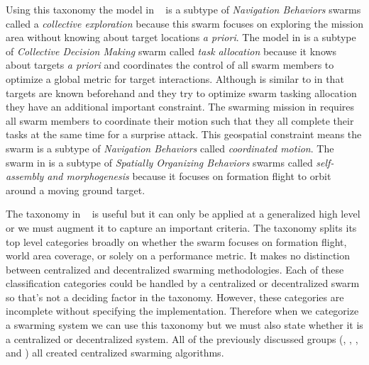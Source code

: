Using this taxonomy the model in ~\textcite{jin} is a subtype of \textit{Navigation Behaviors} swarms called a \textit{collective exploration} because this swarm focuses on exploring the mission area without knowing about target locations \textit{a priori}.  The model in \textcite{bellingham} is a subtype of \textit{Collective Decision Making} swarm called \textit{task allocation}  because it knows about targets \textit{a priori} and coordinates the control of all swarm members to optimize a global metric for target interactions.  Although \textcite{beard} is similar to \textcite{bellingham} in that targets are known beforehand and they try to optimize swarm tasking allocation they have an additional important constraint.  The swarming mission in \textcite{beard} requires all swarm members to coordinate their motion such that they all complete their tasks at the same time for a surprise attack. This geospatial constraint means the swarm is a subtype of \textit{Navigation Behaviors} called \textit{coordinated motion}.  The swarm in \textcite{wheeler} is a subtype of \textit{Spatially Organizing Behaviors} swarms called \textit{self-assembly and morphogenesis} because it focuses on formation flight to orbit around a moving ground target. %

The taxonomy in ~\textcite{iridia} is useful but it can only be applied at a generalized high level or we must augment it to capture an important criteria.  The taxonomy splits its top level categories broadly on whether the swarm focuses on formation flight, world area coverage, or solely on a performance metric.  It makes no distinction between centralized and decentralized swarming methodologies.  Each of these classification categories could be handled by a centralized or decentralized swarm so that's not a deciding factor in the taxonomy.  However, these categories are incomplete without specifying the implementation.  Therefore when we categorize a swarming system we can use this taxonomy but we must also state whether it is a centralized or decentralized system.  All of the previously discussed groups (\textcite{jin}, \textcite{bellingham}, \textcite{beard}, and \textcite{wheeler})  all created centralized swarming algorithms.

